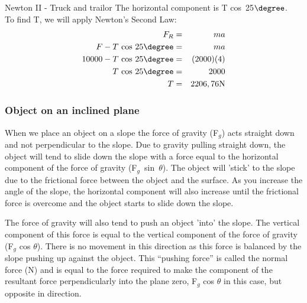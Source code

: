 \begin{wex}{Newton II - Truck and trailor}
{The horizontal component is T cos~25$\degree$.\\

To find T, we will apply Newton's Second Law:\\
\begin{eqnarray*}
F_{R} &=& ma\\
F - T\ \rm{cos}~25\degree &=& ma\\
10 000 - T\ \rm{cos}~25\degree &=& (2000)(4)\\
T\ \rm{cos}~25\degree &=& 2000\\
T &=& 2206,76 \rm{N}
\end{eqnarray*}
}
\end{wex}

\subsubsection{Object on an inclined plane}
When we place an object on a slope the force of gravity (F$_{g}$) acts straight down and not perpendicular to the slope. Due to gravity pulling straight down, the object will tend to slide down the slope with a force equal to the horizontal component of the force of gravity (F$_{g}$~sin~$\theta$). The object will 'stick' to the slope due to the frictional force between the object and the surface. As you increase the angle of the slope, the horizontal component will also increase until the frictional force is overcome and the object starts to slide down the slope.

The force of gravity will also tend to push an object 'into' the slope. The vertical component of this force is equal to the vertical component of the force of gravity (F$_{g}$ cos $\theta$). There is no movement in this direction as this force is balanced by the slope pushing up against the object. This ``pushing force'' is called the normal force (N) and is equal to the force required to make the component of the resultant force perpendicularly into the plane zero, F$_{g}$ cos $\theta$ in this case, but opposite in direction.


